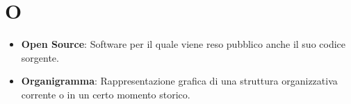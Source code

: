 \section*{O}
\begin{itemize}
	\item
	\textbf{Open Source}: Software per il quale viene reso pubblico anche il suo codice sorgente.
	\item
	\textbf{Organigramma}: Rappresentazione grafica di una struttura organizzativa corrente o in un certo momento storico.
\end{itemize}
\newpage